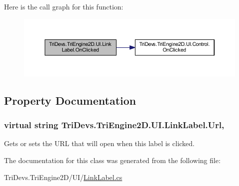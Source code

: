 Here is the call graph for this function\-:\nopagebreak
\begin{figure}[H]
\begin{center}
\leavevmode
\includegraphics[width=350pt]{class_tri_devs_1_1_tri_engine2_d_1_1_u_i_1_1_link_label_adcc511e03ec0c880cdff37947178a756_cgraph}
\end{center}
\end{figure}




\subsection{Property Documentation}
\hypertarget{class_tri_devs_1_1_tri_engine2_d_1_1_u_i_1_1_link_label_a6a4b37c0c7d9910451a8444dfb9853a2}{
\subsubsection[{Url}]{\setlength{\rightskip}{0pt plus 5cm}virtual string Tri\-Devs.\-Tri\-Engine2\-D.\-U\-I.\-Link\-Label.\-Url\hspace{0.3cm}{\ttfamily [get]}, {\ttfamily [set]}}}\label{class_tri_devs_1_1_tri_engine2_d_1_1_u_i_1_1_link_label_a6a4b37c0c7d9910451a8444dfb9853a2}


Gets or sets the U\-R\-L that will open when this label is clicked. 



The documentation for this class was generated from the following file\-:\begin{DoxyCompactItemize}
\item 
Tri\-Devs.\-Tri\-Engine2\-D/\-U\-I/\hyperlink{_link_label_8cs}{Link\-Label.\-cs}\end{DoxyCompactItemize}
